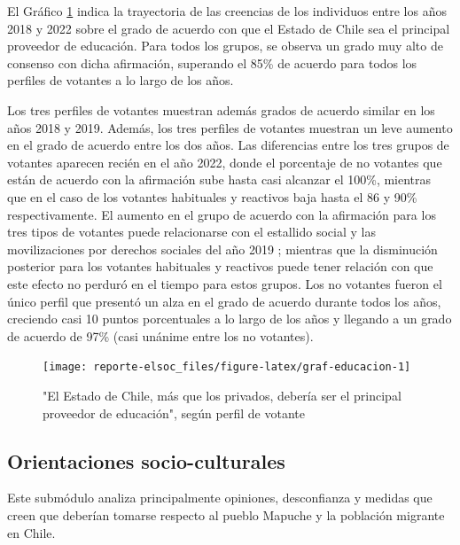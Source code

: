 \documentclass[
  12pt,
]{book}
\begin{document}
El Gráfico \ref{fig:graf-educacion} indica la trayectoria de las creencias de los individuos entre los años 2018 y 2022 sobre el grado de acuerdo con que el Estado de Chile sea el principal proveedor de educación. Para todos los grupos, se observa un grado muy alto de consenso con dicha afirmación, superando el 85\% de acuerdo para todos los perfiles de votantes a lo largo de los años.

Los tres perfiles de votantes muestran además grados de acuerdo similar en los años 2018 y 2019. Además, los tres perfiles de votantes muestran un leve aumento en el grado de acuerdo entre los dos años. Las diferencias entre los tres grupos de votantes aparecen recién en el año 2022, donde el porcentaje de no votantes que están de acuerdo con la afirmación sube hasta casi alcanzar el 100\%, mientras que en el caso de los votantes habituales y reactivos baja hasta el 86 y 90\% respectivamente. El aumento en el grupo de acuerdo con la afirmación para los tres tipos de votantes puede relacionarse con el estallido social y las movilizaciones por derechos sociales del año 2019 ; mientras que la disminución posterior para los votantes habituales y reactivos puede tener relación con que este efecto no perduró en el tiempo para estos grupos. Los no votantes fueron el único perfil que presentó un alza en el grado de acuerdo durante todos los años, creciendo casi 10 puntos porcentuales a lo largo de los años y llegando a un grado de acuerdo de 97\% (casi unánime entre los no votantes).

\begin{figure}

{\centering \texttt{[image: reporte-elsoc\_files/figure-latex/graf-educacion-1]} 

}

\caption{"El Estado de Chile, más que los privados, debería ser el principal proveedor de educación", según perfil de votante}\label{fig:graf-educacion}
\end{figure}

\hypertarget{orientaciones-socio-culturales}{%
\subsection{Orientaciones socio-culturales}\label{orientaciones-socio-culturales}}

Este submódulo analiza principalmente opiniones, desconfianza y medidas que creen que deberían tomarse respecto al pueblo Mapuche y la población migrante en Chile.
\end{document}
